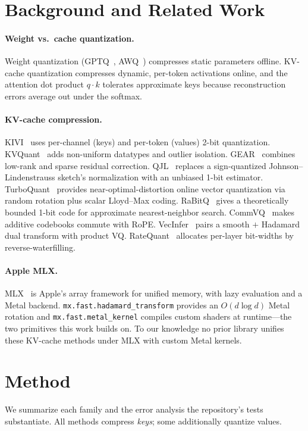 \documentclass[11pt]{article}
\begin{document}
\section{Background and Related Work}
\paragraph{Weight vs.\ cache quantization.} Weight quantization
(GPTQ~\citep{frantar2022gptq}, AWQ~\citep{lin2023awq}) compresses static
parameters offline. KV-cache quantization compresses dynamic, per-token
activations online, and the attention dot product $q\cdot k$ tolerates
approximate keys because reconstruction errors average out under the softmax.

\paragraph{KV-cache compression.} KIVI~\citep{liu2024kivi} uses per-channel
(keys) and per-token (values) 2-bit quantization. KVQuant~\citep{hooper2024kvquant}
adds non-uniform datatypes and outlier isolation. GEAR~\citep{kang2024gear}
combines low-rank and sparse residual correction.
QJL~\citep{zandieh2024qjl} replaces a sign-quantized Johnson--Lindenstrauss
sketch's normalization with an unbiased 1-bit estimator.
TurboQuant~\citep{zandieh2026turboquant} provides near-optimal-distortion
online vector quantization via random rotation plus scalar Lloyd--Max coding.
RaBitQ~\citep{gao2024rabitq} gives a theoretically bounded 1-bit code for
approximate nearest-neighbor search. CommVQ~\citep{commvq2025} makes additive
codebooks commute with RoPE. VecInfer~\citep{yao2025vecinfer} pairs a smooth
$+$ Hadamard dual transform with product VQ. RateQuant~\citep{ratequant2026}
allocates per-layer bit-widths by reverse-waterfilling.

\paragraph{Apple MLX.} MLX~\citep{mlx2023} is Apple's array framework for
unified memory, with lazy evaluation and a Metal backend.
\texttt{mx.fast.hadamard\_transform} provides an $O(d\log d)$ Metal rotation
and \texttt{mx.fast.metal\_kernel} compiles custom shaders at runtime---the
two primitives this work builds on. To our knowledge no prior library unifies
these KV-cache methods under MLX with custom Metal kernels.

\section{Method}
We summarize each family and the error analysis the repository's tests
substantiate. All methods compress \emph{keys}; some additionally quantize
values.
\end{document}
